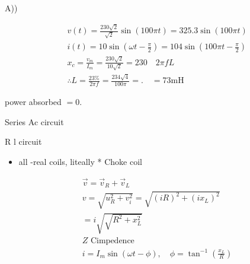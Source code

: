 \documentclass[12pt, a4paper]{article}
\begin{document}
	A))

	$$
		\begin{aligned}
			 & v(t)=\frac{230 \sqrt{2}}{\sqrt{2}} \sin (100 \pi t)=325.3 \sin (100 \pi t)                     \\
			 & i(t)=10 \sin \left(\omega t-\frac{\pi}{2}\right)=104 \sin \left(100 \pi t-\frac{\pi}{2}\right) \\
			 & x_{c}=\frac{v_{m}}{I_{m}}=\frac{230 \sqrt{2}}{10 \sqrt{2}}=230 \quad 2 \pi f L                 \\
			 & \therefore L=\frac{23 \%}{2 \pi f}=\frac{234 \sqrt{4}}{100 \pi}=. \quad=73 \mathrm{mH}
		\end{aligned}
	$$

	power absorbed $=0$.

	Series Ac circuit

	R l circuit

	\begin{itemize}
		\item all -real coils, liteally * Choke coil
	\end{itemize}

	$$
		\begin{aligned}
			 & \vec{v}=\vec{v}_{R}+\vec{v}_{L}                                                 \\
			 & v=\sqrt{u_{R}^{2}+v_{i}^{2}}=\sqrt{(i R)^{2}+\left(i x_{L}\right)^{2}}          \\
			 & =i \sqrt{\sqrt{R^{2}+x_{L}^{2}}}                                                \\
			 & Z \text { Cimpedence }                                                          \\
			 & i=I_{m} \sin (\omega t-\phi), \quad \phi=\tan ^{-1}\left(\frac{x_{L}}{R}\right)
		\end{aligned}
	$$
\end{document}
